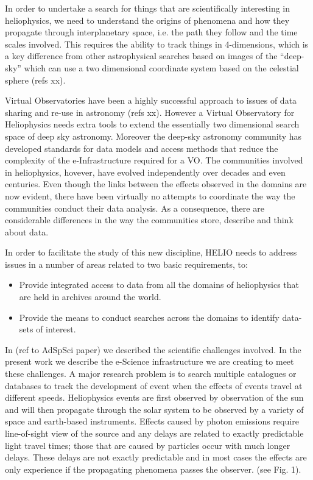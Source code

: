 \documentclass[conference]{IEEEtran}
\begin{document}
In order to undertake a search for things that are scientifically
interesting in heliophysics, we need to understand the origins of
phenomena and how they propagate through interplanetary space,
i.e. the path they follow and the time scales involved. This requires
the ability to track things in 4-dimensions, which is a key
difference from other astrophysical searches based on images of the 
``deep-sky'' which can use a two
dimensional coordinate system based on the celestial sphere (refs xx).

Virtual Observatories have been a highly successful approach to issues
of data sharing and re-use in astronomy (refs xx). However a Virtual
Observatory for Heliophysics needs extra tools to extend the
essentially two dimensional search space of deep sky
astronomy. Moreover the deep-sky astronomy community has developed
standards for data models and access methods that reduce the
complexity of the e-Infrastructure required for a VO. The communities
involved in heliophysics, hovever, have evolved independently over
decades and even centuries. Even though the links between the effects
observed in the domains are now evident, there have been virtually no
attempts to coordinate the way the communities conduct their data
analysis. As a consequence, there are considerable differences in the
way the communities store, describe and think about data.

In order to facilitate the study of this new discipline,
HELIO needs to address issues in a number of areas related
to two basic requirements, to:
\begin{itemize}
 \item Provide integrated access to data from all the domains
of heliophysics that are held in archives around the
world.
\item Provide the means to conduct searches across the
domains to identify data-sets of interest.
\end{itemize}

In (ref to AdSpSci paper) we described the scientific challenges involved.
In the present work we describe the e-Science infrastructure we are 
creating to meet these challenges. A major research problem is to 
search multiple catalogues or databases to track the development of 
event when the effects of events travel at different speeds. Heliophysics
events are first observed by observation of the sun and will then propagate
through the solar system to be observed by a variety of space and earth-based
instruments. Effects caused by photon emissions require line-of-sight
view of the source and any delays are related to exactly predictable light travel
times; those that are caused by particles occur with much
longer delays. These delays are not exactly predictable and in most cases the effects are only experience
if the propagating phenomena passes the observer.
 (see
Fig. 1).
\end{document}
